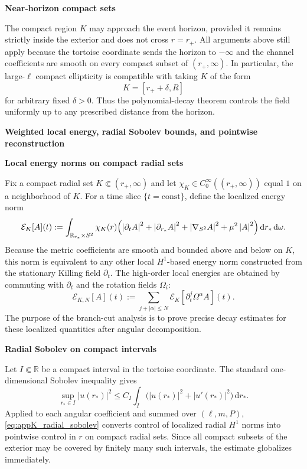 \documentclass[12pt]{article}
\numberwithin{equation}{section}
\theoremstyle{plain}
\theoremstyle{definition}
\theoremstyle{remark}
\newcommand{\R}{\mathbb R}
\newcommand{\dd}{\mathrm d}
\newcommand{\abs}[1]{\left|#1\right|}
\newcommand{\appheading}[1]{\par\medskip\noindent\textbf{#1}\par\smallskip\noindent}
\newcommand{\applabelheading}[2]{\par\medskip\phantomsection\label{#2}\noindent\textbf{#1}\par\smallskip\noindent}
\begin{document}
\appheading{Near-horizon compact sets}

The compact region $K$ may approach the event horizon, provided it remains strictly inside the exterior and does not cross $r=r_+$.  All arguments above still apply because the tortoise coordinate sends the horizon to $-\infty$ and the channel coefficients are smooth on every compact subset of $(r_+,\infty)$.  In particular, the large-$\ell$ compact ellipticity is compatible with taking $K$ of the form
\[
   K=[r_++\delta,R]
\]
for arbitrary fixed $\delta>0$.  Thus the polynomial-decay theorem controls the field uniformly up to any prescribed distance from the horizon.

\applabelheading{Weighted local energy, radial Sobolev bounds, and pointwise reconstruction}{app:weighted_energy}
\appheading{Local energy norms on compact radial sets}

Fix a compact radial set $K\Subset(r_+,\infty)$ and let $\chi_K\in C_0^\infty((r_+,\infty))$ equal $1$ on a neighborhood of $K$.  For a time slice $\{t=\mathrm{const}\}$, define the localized energy norm
\[
   \mathcal E_K[A](t)
   :=
   \int_{\R_{r_*}\times S^2}
      \chi_K(r)
      \Bigl(
         \abs{\partial_t A}^2+\abs{\partial_{r_*}A}^2+\abs{\nabla_{S^2}A}^2+\mu^2\abs{A}^2
      \Bigr)\,\dd r_*\,\dd\omega.
\]
Because the metric coefficients are smooth and bounded above and below on $K$, this norm is equivalent to any other local $H^1$-based energy norm constructed from the stationary Killing field $\partial_t$.  The high-order local energies are obtained by commuting with $\partial_t$ and the rotation fields $\Omega_i$:
\[
   \mathcal E_{K,N}[A](t)
   :=
   \sum_{j+|\alpha|\le N}
      \mathcal E_K[\partial_t^j\Omega^\alpha A](t).
\]
The purpose of the branch-cut analysis is to prove precise decay estimates for these localized quantities after angular decomposition.

\appheading{Radial Sobolev on compact intervals}

Let $I\Subset\R$ be a compact interval in the tortoise coordinate.  The standard one-dimensional Sobolev inequality gives
\begin{equation}\label{eq:appK_radial_sobolev}
   \sup_{r_*\in I}\abs{u(r_*)}^2
   \le
   C_I
   \int_I \bigl(\abs{u(r_*)}^2+\abs{u'(r_*)}^2\bigr)\,\dd r_*.
\end{equation}
Applied to each angular coefficient and summed over $(\ell,m,P)$, \eqref{eq:appK_radial_sobolev} converts control of localized radial $H^1$ norms into pointwise control in $r$ on compact radial sets.  Since all compact subsets of the exterior may be covered by finitely many such intervals, the estimate globalizes immediately.
\end{document}
